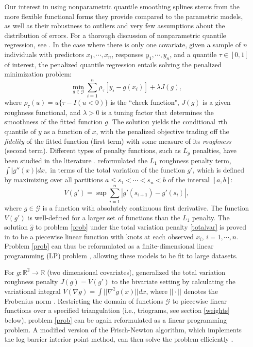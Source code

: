 \documentclass{statsoc}
\begin{document}
Our interest in using nonparametric quantile smoothing splines stems from the more flexible functional forms they provide compared to the parametric models, as well as their robustness to outliers and very few assumptions about the distribution of errors. For a thorough discussion of nonparametric quantile regression, see \citet{koenker2005quantile,koenker1978regression}. In the case where there is only one covariate, given a sample of $n$ individuals with predictors $x_1,\cdots, x_n$, responses $y_1,\cdots, y_n$, and a quantile $\tau \in [0,1]$ of interest, the penalized quantile regression entails solving the penalized minimization problem:
\begin{equation}
\label{prob}
    \min_{g\in \mathcal{G}}\sum_{i=1}^n \rho_{\tau}[y_i - g(x_i)] + \lambda J(g),
\end{equation}
where $\rho_{\tau} (u) = u\{\tau-I(u<0)\}$ is the ``check function", $J(g)$ is a given roughness functional, and $\lambda>0$ is a tuning factor that determines the smoothness of the fitted function $g$. The solution yields the conditional $\tau$th quantile of $y$ as a function of $x$, with the penalized objective trading off the {\it fidelity} of the fitted function (first term) with some measure of its {\it roughness} (second term). Different types of penalty functions, such as $L_p$ penalties, have been studied in the literature \citep{cox1983asymptotics,bosch1995convergent}. \citet{koenker1994quantile} reformulated the $L_1$ roughness penalty term, $\int |g''(x)| dx,$ in terms of the total variation of the function $g'$, which is defined by maximizing over all partitions $a\leq s_1<\cdots<s_n<b$ of the interval $[a,b]:$
\begin{equation}
\label{totalvar}
    V(g') = \sup \sum_{i=1}^n |g'(s_{i+1})-g'(s_i)|,
\end{equation}
where $g\in \mathcal{G}$ is a function with absolutely continuous first derivative. The function $V(g')$ is well-defined for a larger set of functions than the $L_1$ penalty. The solution $\hat{g}$ to problem \eqref{prob} under the total variation penalty \eqref{totalvar} is proved in \citet{koenker1994quantile} to be a piecewise linear function with knots at  {each} observed $x_i$,  {$i=1,\cdots,n$}. Problem \eqref{prob} can thus be reformulated as a finite-dimensional linear programming (LP) problem \citep{koenker1994quantile},   {allowing these models to be fit to large datasets}. 

For $g : \mathbb{R}^2 \rightarrow \mathbb{R}$ (two dimensional covariates), \citet{koenker2004penalized} generalized the total variation roughness penalty $J(g)=V(g')$ to the bivariate setting by calculating the variational integral $V(\nabla g) = \int ||\nabla^2g(x)||dx$, where $||\cdot||$ denotes the Frobenius norm \citep{serrin1961definition}. Restricting the domain of functions $\mathcal{G}$ to piecewise linear functions over a specified triangulation (i.e., triograms,  {see section \ref{weights} below}), problem \eqref{prob} can be again reformulated as a linear programming problem. A modified version of the Frisch-Newton algorithm, which implements the log barrier interior point method, can then solve the problem efficiently \citep{koenker2005frisch}.
\end{document}
